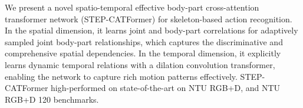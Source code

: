 \documentclass{bmvc2k}
\begin{document}
We present a novel spatio-temporal effective body-part cross-attention transformer network (STEP-CATFormer) for skeleton-based action recognition.
In the spatial dimension, it learns joint and body-part correlations for adaptively sampled joint body-part relationships, which captures the discriminative and comprehensive spatial dependencies.
In the temporal dimension, it explicitly learns dynamic temporal relations with a dilation convolution transformer, enabling the network to capture rich motion patterns effectively.
STEP-CATFormer high-performed on state-of-the-art on NTU RGB+D, and NTU RGB+D 120 benchmarks.



\end{document}

